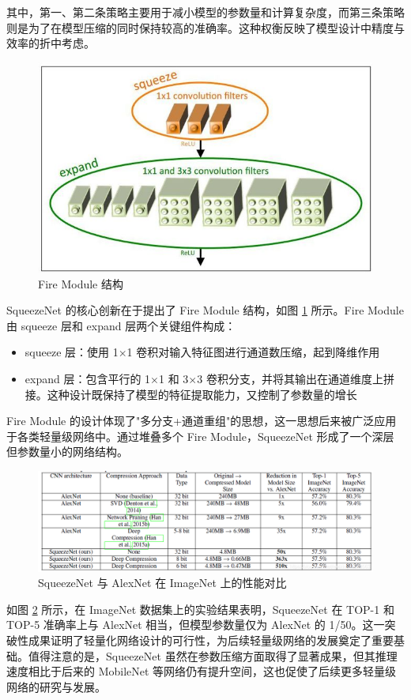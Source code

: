 \documentclass{article}
\begin{document}
其中，第一、第二条策略主要用于减小模型的参数量和计算复杂度，而第三条策略则是为了在模型压缩的同时保持较高的准确率。这种权衡反映了模型设计中精度与效率的折中考虑。

\begin{figure}[htbp]
    \centering
    \includegraphics[width=0.7\linewidth]{imgs/fire_module.jpg}
    \caption{Fire Module 结构}
    \label{fig:fire_module}
\end{figure}

SqueezeNet 的核心创新在于提出了 Fire Module 结构，如图 \ref{fig:fire_module} 所示。Fire Module 由 squeeze 层和 expand 层两个关键组件构成：
\begin{itemize}
    \item squeeze 层：使用 1$\times$1 卷积对输入特征图进行通道数压缩，起到降维作用
    \item expand 层：包含平行的 1$\times$1 和 3$\times$3 卷积分支，并将其输出在通道维度上拼接。这种设计既保持了模型的特征提取能力，又控制了参数量的增长
\end{itemize}

Fire Module 的设计体现了"多分支+通道重组"的思想，这一思想后来被广泛应用于各类轻量级网络中。通过堆叠多个 Fire Module，SqueezeNet 形成了一个深层但参数量小的网络结构。

\begin{figure}[htbp]
    \centering
    \includegraphics[width=0.8\linewidth]{imgs/squeezenet_vs_alexnet.png}
    \caption{SqueezeNet 与 AlexNet 在 ImageNet 上的性能对比}
    \label{fig:squeezenet_comp}
\end{figure}

如图 \ref{fig:squeezenet_comp} 所示，在 ImageNet 数据集上的实验结果表明，SqueezeNet 在 TOP-1 和 TOP-5 准确率上与 AlexNet 相当，但模型参数量仅为 AlexNet 的 1/50。这一突破性成果证明了轻量化网络设计的可行性，为后续轻量级网络的发展奠定了重要基础。值得注意的是，SqueezeNet 虽然在参数压缩方面取得了显著成果，但其推理速度相比于后来的 MobileNet 等网络仍有提升空间，这也促使了后续更多轻量级网络的研究与发展。
\end{document}
